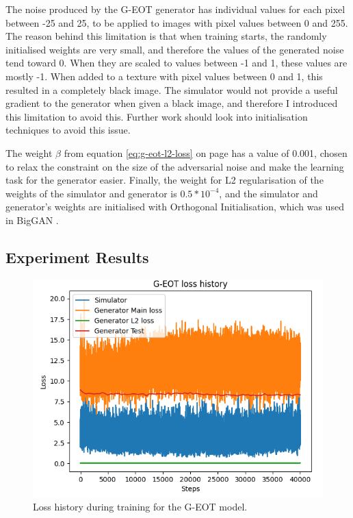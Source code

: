 The noise produced by the G-EOT generator has individual values for each pixel between -25 and 25, to be applied to images with pixel values between 0 and 255. The reason behind this limitation is that when training starts, the randomly initialised weights are very small, and therefore the values of the generated noise tend toward 0. When they are scaled to values between -1 and 1, these values are mostly -1. When added to a texture with pixel values between 0 and 1, this resulted in a completely black image. The simulator would not provide a useful gradient to the generator when given a black image, and therefore I introduced this limitation to avoid this. Further work should look into initialisation techniques to avoid this issue.

The weight $\beta$ from equation \ref{eq:g-eot-l2-loss} on page \pageref{eq:g-eot-l2-loss} has a value of 0.001, chosen to relax the constraint on the size of the adversarial noise and make the learning task for the generator easier. Finally, the weight for L2 regularisation of the weights of the simulator and generator is $0.5 * 10^{-4}$, and the simulator and generator's weights are initialised with Orthogonal Initialisation, which was used in BigGAN \cite{big_gan}.

\subsection{Experiment Results}
    \label{subsec:g_eot_experiment_results}
    
\begin{figure}[ht]
    \centering
    \includegraphics[width=1\textwidth]{graphics/g_eot_loss_exp1.PNG}
    \caption{Loss history during training for the G-EOT model.}
    \label{fig:g_eot_loss_history}
\end{figure}
    
